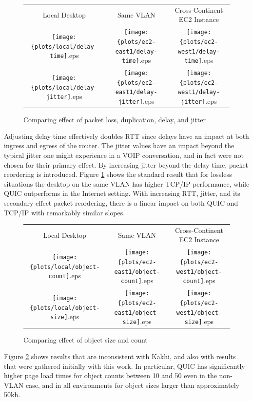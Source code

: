 \documentclass[12pt]{article}
\begin{document}
\begin{figure}[h]
\centering
\begin{tabular}{c c c}
	Local Desktop & Same VLAN & Cross-Continent EC2 Instance \\
	\texttt{[image: \{plots/local/delay-time]}.eps} &
	\texttt{[image: \{plots/ec2-east1/delay-time]}.eps} &
	\texttt{[image: \{plots/ec2-west1/delay-time]}.eps} \\

	\texttt{[image: \{plots/local/delay-jitter]}.eps} &
	\texttt{[image: \{plots/ec2-east1/delay-jitter]}.eps} &
	\texttt{[image: \{plots/ec2-west1/delay-jitter]}.eps} \\
\end{tabular}
\caption{Comparing effect of packet loss, duplication, delay, and jitter}
\label{figs:packet_timing}
\end{figure}

Adjusting delay time effectively doubles RTT since delays have an impact at both ingress and egress of the router. The jitter values have an impact beyond the typical jitter one might experience in a VOIP conversation, and in fact were not chosen for their primary effect. By increasing jitter beyond the delay time, packet reordering is introduced. Figure \ref{figs:packet_timing} shows the standard result that for lossless situations the desktop on the same VLAN has higher TCP/IP performance, while QUIC outperforms in the Internet setting. With increasing RTT, jitter, and its secondary effect packet reordering, there is a linear impact on both QUIC and TCP/IP with remarkably similar slopes.

\begin{figure}[h]
\centering
\begin{tabular}{c c c}
	Local Desktop & Same VLAN & Cross-Continent EC2 Instance \\
	\texttt{[image: \{plots/local/object-count]}.eps} &
	\texttt{[image: \{plots/ec2-east1/object-count]}.eps} &
	\texttt{[image: \{plots/ec2-west1/object-count]}.eps} \\

	\texttt{[image: \{plots/local/object-size]}.eps} &
	\texttt{[image: \{plots/ec2-east1/object-size]}.eps} &
	\texttt{[image: \{plots/ec2-west1/object-size]}.eps} \\
\end{tabular}
\caption{Comparing effect of object size and count}
\label{figs:objects}
\end{figure}

Figure \ref{figs:objects} shows results that are inconsistent with Kakhi, and also with results that were gathered initially with this work. In particular, QUIC has significantly higher page load times for object counts between 10 and 50 even in the non-VLAN case, and in all environments for object sizes larger than approximately 50kb.
\end{document}
